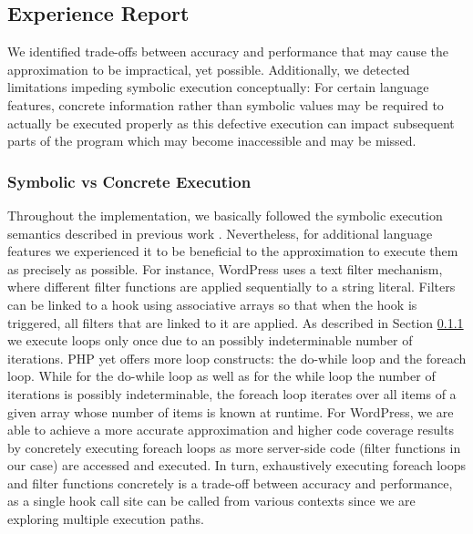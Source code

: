 \documentclass[sigconf]{acmart}
\renewcommand{\sf}[1]{\textsf{#1}}
\begin{document}
\subsection{Experience Report}\label{sec:experience_report}
We identified trade-offs between accuracy and performance that may
cause the approximation to be impractical, yet possible. Additionally, we
detected limitations impeding symbolic execution conceptually: For certain
language features, concrete information rather than symbolic values may be required to
actually be executed properly as this defective execution can impact subsequent
parts of the program which may become inaccessible and may be missed.

\subsubsection{Symbolic vs Concrete Execution}
Throughout the implementation, we basically followed the symbolic execution
semantics described in previous work \cite{Nguyen:2014:BCG:2635868.2635928}.
Nevertheless, for additional language features we experienced it to be beneficial to the
approximation to execute them as precisely as possible.
For instance, \sf{WordPress} uses a text filter mechanism, where different
filter functions are applied sequentially to a string literal. Filters can
be linked to a hook using  associative arrays so that when the hook is
triggered, all filters that are linked to it are applied. As described in
Section \ref{} we execute loops only once due to an possibly
indeterminable number of iterations. PHP yet offers more loop constructs: the
do-while loop and the foreach loop. While for the do-while loop as well as for
the while loop the number of iterations is possibly indeterminable, the foreach
loop iterates over all items of a given array whose number of items is known at
runtime. For \sf{WordPress}, we are able to achieve a more accurate
approximation and higher code coverage results by concretely executing foreach
loops as more server-side code (filter functions in our case) are accessed and
executed. In turn, exhaustively executing foreach loops and filter functions
concretely is a trade-off between accuracy and performance, as a single hook
call site can be called from various contexts since we are exploring multiple
execution paths.
\end{document}
